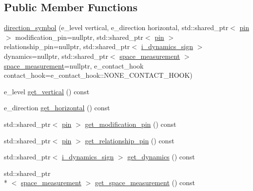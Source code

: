 \subsection*{Public Member Functions}
\begin{DoxyCompactItemize}
\item 
\hyperlink{classmae_1_1fl_1_1laban_1_1mv_1_1direction__symbol_abae9d91d2b0448e8aaa5a8b427f029f7}{direction\-\_\-symbol} (e\-\_\-level vertical, e\-\_\-direction horizontal, std\-::shared\-\_\-ptr$<$ \hyperlink{classmae_1_1fl_1_1laban_1_1mv_1_1pin}{pin} $>$ modification\-\_\-pin=nullptr, std\-::shared\-\_\-ptr$<$ \hyperlink{classmae_1_1fl_1_1laban_1_1mv_1_1pin}{pin} $>$ relationship\-\_\-pin=nullptr, std\-::shared\-\_\-ptr$<$ \hyperlink{classmae_1_1fl_1_1laban_1_1mv_1_1i__dynamics__sign}{i\-\_\-dynamics\-\_\-sign} $>$ dynamics=nullptr, std\-::shared\-\_\-ptr$<$ \hyperlink{classmae_1_1fl_1_1laban_1_1mv_1_1space__measurement}{space\-\_\-measurement} $>$ \hyperlink{classmae_1_1fl_1_1laban_1_1mv_1_1space__measurement}{space\-\_\-measurement}=nullptr, e\-\_\-contact\-\_\-hook contact\-\_\-hook=e\-\_\-contact\-\_\-hook\-::\-N\-O\-N\-E\-\_\-\-C\-O\-N\-T\-A\-C\-T\-\_\-\-H\-O\-O\-K)
\item 
e\-\_\-level \hyperlink{classmae_1_1fl_1_1laban_1_1mv_1_1direction__symbol_a0d80aa6b7d1d8cdd5cf3df033c680148}{get\-\_\-vertical} () const 
\item 
e\-\_\-direction \hyperlink{classmae_1_1fl_1_1laban_1_1mv_1_1direction__symbol_aab2d3a4913b21e664e5b6d52c551568e}{get\-\_\-horizontal} () const 
\item 
std\-::shared\-\_\-ptr$<$ \hyperlink{classmae_1_1fl_1_1laban_1_1mv_1_1pin}{pin} $>$ \hyperlink{classmae_1_1fl_1_1laban_1_1mv_1_1direction__symbol_a00fe8b9674d324ad875a69b4621ce4a6}{get\-\_\-modification\-\_\-pin} () const 
\item 
std\-::shared\-\_\-ptr$<$ \hyperlink{classmae_1_1fl_1_1laban_1_1mv_1_1pin}{pin} $>$ \hyperlink{classmae_1_1fl_1_1laban_1_1mv_1_1direction__symbol_a2c709125f5108e611cc971e4eff4ba61}{get\-\_\-relationship\-\_\-pin} () const 
\item 
std\-::shared\-\_\-ptr$<$ \hyperlink{classmae_1_1fl_1_1laban_1_1mv_1_1i__dynamics__sign}{i\-\_\-dynamics\-\_\-sign} $>$ \hyperlink{classmae_1_1fl_1_1laban_1_1mv_1_1direction__symbol_a298ccff5d107bef2359f485f17dd08f8}{get\-\_\-dynamics} () const 
\item 
std\-::shared\-\_\-ptr\\*
$<$ \hyperlink{classmae_1_1fl_1_1laban_1_1mv_1_1space__measurement}{space\-\_\-measurement} $>$ \hyperlink{classmae_1_1fl_1_1laban_1_1mv_1_1direction__symbol_a0c57ad8ba8bb6502c42155fc2f5a2708}{get\-\_\-space\-\_\-measurement} () const 

\end{DoxyCompactItemize}
